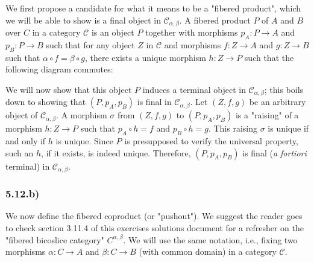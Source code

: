 \documentclass[12pt, letterpaper, twoside]{report}
\begin{document}
We first propose a candidate for what it means to be a "fibered product", which we will be able to show is a final object in $\mathcal{C}_{\alpha,\beta}$. A fibered product $P$ of $A$ and $B$ over $C$ in a category $\mathcal{C}$ is an object $P$ together with morphisms $p_A : P \to A$ and $p_B : P \to B$ such that for any object $Z$ in $\mathcal{C}$ and morphisms $f : Z \to A$ and $g : Z \to B$ such that $\alpha \circ f = \beta \circ g$, there exists a unique morphism $h : Z \to P$ such that the following diagram commutes:


We will now show that this object $P$ induces a terminal object in $\mathcal{C}_{\alpha,\beta}$; this boils down to showing that $(P, p_A, p_B)$ is final in $\mathcal{C}_{\alpha,\beta}$. Let $(Z, f, g)$ be an arbitrary object of $\mathcal{C}_{\alpha,\beta}$. A morphism $\sigma$ from $(Z, f, g)$ to $(P, p_A, p_B)$ is a "raising" of a morphism $h : Z \to P$ such that $p_A \circ h = f$ and $p_B \circ h = g$. This raising $\sigma$ is unique if and only if $h$ is unique. Since $P$ is presupposed to verify the universal property, such an $h$, if it exists, is indeed unique. Therefore, $(P, p_A, p_B)$ is final (\textit{a fortiori} terminal) in $\mathcal{C}_{\alpha,\beta}$.


\subsubsection*{5.12.b)}

We now define the fibered coproduct (or "pushout"). We suggest the reader goes to check section 3.11.4 of this exercises solutions document for a refresher on the "fibered bicoslice category" $C^{\alpha,\beta}$. We will use the same notation, i.e., fixing two morphisms $\alpha : C \to A$ and $\beta : C \to B$ (with common domain) in a category $\mathcal{C}$.
\end{document}
